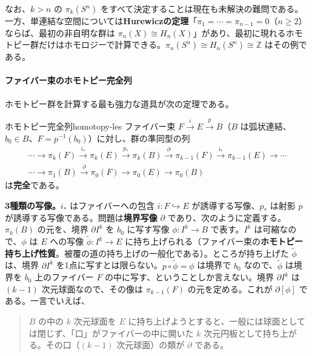 \documentclass[uplatex, dvipdfmx, book]{jsbook}
\begin{document}
なお、$k > n$ の $\pi_k(S^n)$ をすべて決定することは現在も未解決の難問である。一方、単連結な空間については\textbf{Hurewiczの定理}「$\pi_1 = \cdots = \pi_{n-1} = 0$（$n \ge 2$）ならば、最初の非自明な群は $\pi_n(X) \cong H_n(X)$」があり、最初に現れるホモトピー群だけはホモロジーで計算できる。$\pi_n(S^n) \cong H_n(S^n) \cong \mathbb{Z}$ はその例である。

\paragraph{ファイバー束のホモトピー完全列}
ホモトピー群を計算する最も強力な道具が次の定理である。

\begin{mythm}{ホモトピー完全列}{homotopy-les}
ファイバー束 $F \xrightarrow{\ i\ } E \xrightarrow{\ p\ } B$（$B$ は弧状連結、$b_0 \in B$、$F = p^{-1}(b_0)$）に対し、群の準同型の列
\begin{equation}
    \begin{aligned}
        \cdots \to \pi_k(F) \xrightarrow{\ i_*\ } \pi_k(E) \xrightarrow{\ p_*\ } \pi_k(B) \xrightarrow{\ \partial\ } \pi_{k-1}(F) \xrightarrow{\ i_*\ } \pi_{k-1}(E) \to \cdots \\
        \cdots \to \pi_1(B) \xrightarrow{\ \partial\ } \pi_0(F) \to \pi_0(E) \to \pi_0(B)
    \end{aligned}
    \label{eq:homotopy-les}
\end{equation}
は\textbf{完全}である。
\end{mythm}

\textbf{3種類の写像。}$i_*$ はファイバーへの包含 $i: F \hookrightarrow E$ が誘導する写像、$p_*$ は射影 $p$ が誘導する写像である。問題は\textbf{境界写像} $\partial$ であり、次のように定義する。$\pi_k(B)$ の元を、境界 $\partial I^k$ を $b_0$ に写す写像 $\phi: I^k \to B$ で表す。$I^k$ は可縮なので、$\phi$ は $E$ への写像 $\tilde{\phi}: I^k \to E$ に持ち上げられる（ファイバー束の\textbf{ホモトピー持ち上げ性質}。被覆の道の持ち上げの一般化である）。ところが持ち上げた $\tilde{\phi}$ は、境界 $\partial I^k$ を1点に写すとは限らない。$p \circ \tilde{\phi} = \phi$ は境界で $b_0$ なので、$\tilde{\phi}$ は境界を $b_0$ 上のファイバー $F$ の中に写す、ということしか言えない。境界 $\partial I^k$ は $(k-1)$ 次元球面なので、その像は $\pi_{k-1}(F)$ の元を定める。これが $\partial[\phi]$ である。一言でいえば、
\begin{quote}
    $B$ の中の $k$ 次元球面を $E$ に持ち上げようとすると、一般には球面としては閉じず、「口」がファイバーの中に開いた $k$ 次元円板として持ち上がる。その口（$(k-1)$ 次元球面）の類が $\partial$ である。
\end{quote}
\end{document}
